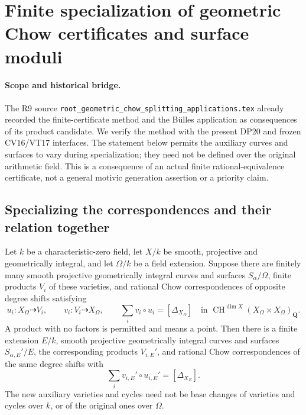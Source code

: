 \section{Finite specialization of geometric Chow certificates and surface moduli}
\label{r20gc:section}

\paragraph{Scope and historical bridge.}
The R9 source
\texttt{root\_geometric\_chow\_splitting\_applications.tex}
already recorded the finite-certificate method and the B\"ulles
application as consequences of its product candidate.  We verify
the method with the present DP20 and frozen CV16/VT17 interfaces.
The statement below permits the auxiliary curves and surfaces to
vary during specialization; they need not be defined over the
original arithmetic field.  This is a consequence of an actual
finite rational-equivalence certificate, not a general motivic
generation assertion or a priority claim.

\subsection{Specializing the correspondences and their relation together}

\begin{lemma}
\label{r20gc:finite-certificate}
Let $k$ be a characteristic-zero field, let $X/k$ be smooth,
projective and geometrically integral, and let $\Omega/k$ be a
field extension.  Suppose there are finitely many smooth projective
geometrically integral curves and surfaces $S_\alpha/\Omega$,
finite products $V_i$ of these varieties, and rational Chow
correspondences of opposite degree shifts satisfying
\[
 u_i:X_\Omega\dashrightarrow V_i,\qquad
 v_i:V_i\dashrightarrow X_\Omega,\qquad
 \sum_i v_i\circ u_i=[\Delta_{X_\Omega}]
       \quad\text{in }\operatorname{CH}^{\dim X}
                    (X_\Omega\times X_\Omega)_{\mathbf Q}.
 \tag{GC20.1}\label{r20gc:geometric-certificate}
\]
A product with no factors is permitted and means a point.
Then there is a finite extension $E/k$, smooth projective
geometrically integral curves and surfaces $S_{\alpha,E}'/E$,
the corresponding products $V_{i,E}'$, and rational Chow
correspondences of the same degree shifts with
\[
 \sum_i v_{i,E}'\circ u_{i,E}'=[\Delta_{X_E}].
 \tag{GC20.2}\label{r20gc:finite-identity}
\]
The new auxiliary varieties and cycles need not be base changes
of varieties and cycles over $k$, or of the original ones over
$\Omega$.
\end{lemma}

